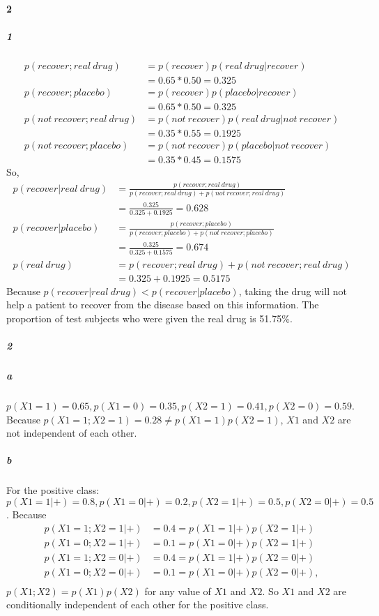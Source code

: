 \documentclass[22pt]{article}
\begin{document}
	\paragraph{2}
		\subparagraph{1} 
		\begin{align}
			p(recover;real\ drug) & = p(recover)p(real\ drug|recover)\\
			& = 0.65* 0.50 = 0.325\\
			p(recover;placebo) & = p(recover)p(placebo|recover)\\
			& = 0.65*0.50 = 0.325\\
			p(not\ recover;real\ drug) & = p(not\ recover)p(real\ drug|not\ recover)\\
			& = 0.35*0.55 = 0.1925\\
			p(not\ recover;placebo) & = p(not\ recover)p(placebo|not\ recover)\\
			& = 0.35*0.45 = 0.1575
		\end{align}
		So, 
		\begin{align}
			p(recover|real\ drug) & = \frac{p(recover;real\ drug)}{p(recover;real\ drug)+p(not\ recover;real\ drug)}\\
			&=\frac{0.325}{0.325+0.1925} = 0.628\\
			p(recover|placebo) & = \frac{p(recover;placebo)}{p(recover;placebo)+p(not\ recover;placebo)}\\
			& = \frac{0.325}{0.325+0.1575} = 0.674\\
			p(real\ drug) & = p(recover;real\ drug) + p(not\ recover;real\ drug)\\
			& = 0.325+ 0.1925 = 0.5175
		\end{align}
		Because $p(recover|real\ drug)<p(recover|placebo)$,  taking the drug will not help a patient to recover from the disease based on this information. The proportion of test subjects who
		were given the real drug is 51.75\%.

		\subparagraph{2} 
			\subparagraph{a} $p(X1=1) = 0.65, p(X1=0) = 0.35,p(X2=1)=0.41,p(X2=0) = 0.59$. Because $p(X1=1;X2=1) = 0.28 \not= p(X1=1)p(X2=1)$, $X1$ and $X2$ are not independent of each other.

			\subparagraph{b} For the positive class: $p(X1=1|+) = 0.8, p(X1=0|+) = 0.2,p(X2=1|+)=0.5,p(X2=0|+) = 0.5$.
			Because
			\begin{align}
				p(X1=1;X2 = 1|+) & = 0.4 = p(X1=1|+)p(X2=1|+)\\
				p(X1=0;X2 = 1|+) & = 0.1 = p(X1=0|+)p(X2=1|+)\\
				p(X1=1;X2 = 0|+) & = 0.4 = p(X1=1|+)p(X2=0|+)\\
				p(X1=0;X2 = 0|+) & = 0.1 = p(X1=0|+)p(X2=0|+),\\
			\end{align}
			$p(X1;X2) = p(X1)p(X2)$ for any value of $X1$ and $X2$. So $X1$ and $X2$ are conditionally independent of each other for the positive class.
\end{document}
